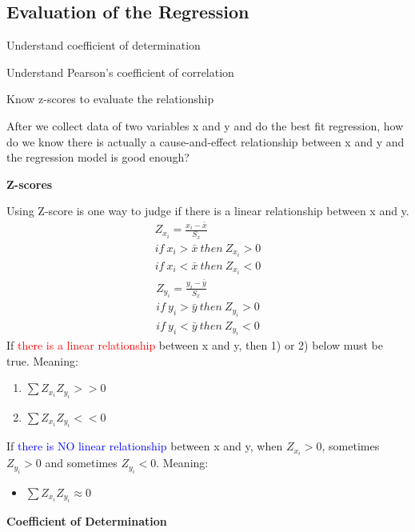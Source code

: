 \subsection{Evaluation of the Regression}
\begin{objectives}
    \item Understand coefficient of determination
    \item Understand Pearson's coefficient of correlation
    \item Know z-scores to evaluate the relationship
\end{objectives}
\vbox{}
After we collect data of two variables x and y and do the best fit regression, how do we know there is actually a cause-and-effect relationship between x and y and the regression model is good enough?
\vspace{3ex}
\begin{Center}
    \textbf{Z-scores}
\end{Center}
Using Z-score is one way to judge if there is a linear relationship between x and y.
\begin{align}
    Z_{x_i}=\frac{x_i-\bar{x}}{S_x}\\
    if\ x_i>\bar{x}\ then\ Z_{x_i}>0\\
    if\ x_i<\bar{x}\ then\ Z_{x_i}<0
\end{align}
\begin{align}
    Z_{y_i}=\frac{y_i-\bar{y}}{S_x}\\
    if\ y_i>\bar{y}\ then\ Z_{y_i}>0\\
    if\ y_i<\bar{y}\ then\ Z_{y_i}<0
\end{align}
If \textcolor{red}{there is a linear relationship} between x and y, then 1) or 2) below must be true. Meaning:
\begin{enumerate}
    \item \(\sum{Z_{x_i}Z_{y_i}}>>0\)
    \item \(\sum{Z_{x_i}Z_{y_i}}<<0\)
\end{enumerate}
If \textcolor{blue}{there is NO linear relationship} between x and y, when \(Z_{x_i}>0\), sometimes \(Z_{y_i}>0\) and sometimes \(Z_{y_i}<0\). Meaning:
\begin{itemize}
    \item \(\sum{Z_{x_i}Z_{y_i}}\approx 0\)
\end{itemize}
\vspace{3ex}
\begin{Center}
    \textbf{Coefficient of Determination}
\end{Center}
